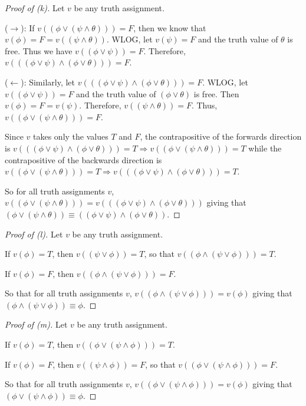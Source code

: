 \documentclass{article}
\theoremstyle{remark}\newtheorem{remark}{Remark}
\theoremstyle{plain}
\begin{document}
\begin{proof}[Proof of (k)]
    Let $v$ be any truth assignment.

    ($\rightarrow$):
    If $v((\phi \lor (\psi \land \theta))) = F$, then we know that $v(\phi) = F = v((\psi \land \theta))$. WLOG, let $v(\psi) = F$ and the truth value of $\theta$ is free. Thus we have $v((\phi \lor \psi)) = F$. Therefore, $v(((\phi \lor \psi) \land (\phi \lor \theta))) = F$.

    ($\leftarrow$):
    Similarly, let $v(((\phi \lor \psi) \land (\phi \lor \theta))) = F$. WLOG, let $v((\phi \lor \psi)) = F$ and the truth value of $(\phi \lor \theta)$ is free. Then $v(\phi) = F = v(\psi)$. Therefore, $v((\psi \land \theta)) = F$. Thus, $v((\phi \lor (\psi \land \theta))) = F$.

    Since $v$ takes only the values $T$ and $F$, the contrapositive of the forwards direction is $v(((\phi \lor \psi) \land (\phi \lor \theta))) = T \Rightarrow v((\phi \lor (\psi \land \theta))) = T$ while the contrapositive of the backwards direction is $v((\phi \lor (\psi \land \theta))) = T \Rightarrow v(((\phi \lor \psi) \land (\phi \lor \theta))) = T$.

    So for all truth assignments $v$, $v((\phi \lor (\psi \land \theta))) = v(((\phi \lor \psi) \land (\phi \lor \theta)))$ giving that $(\phi \lor (\psi \land \theta)) \equiv ((\phi \lor \psi) \land (\phi \lor \theta))$.
\end{proof}

\begin{proof}[Proof of (l)]
    Let $v$ be any truth assignment.

    If $v(\phi) = T$, then $v((\psi \lor \phi)) = T$, so that $v((\phi \land (\psi \lor \phi))) = T$.

    If $v(\phi) = F$, then $v((\phi \land (\psi \lor \phi))) = F$.

    So that for all truth assignments $v$, $v((\phi \land (\psi \lor \phi))) = v(\phi)$ giving that $(\phi \land (\psi \lor \phi)) \equiv \phi$.
\end{proof}

\begin{proof}[Proof of (m)]
    Let $v$ be any truth assignment.

    If $v(\phi) = T$, then $v((\phi \lor (\psi \land \phi))) = T$.

    If $v(\phi) = F$, then $v((\psi \land \phi)) = F$, so that $v((\phi \lor (\psi \land \phi))) = F$.

    So that for all truth assignments $v$, $v((\phi \lor (\psi \land \phi))) = v(\phi)$ giving that $(\phi \lor (\psi \land \phi)) \equiv \phi$.
\end{proof}
\end{document}
